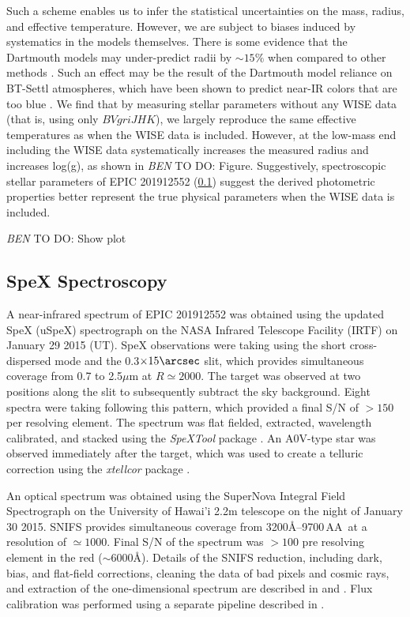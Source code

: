 \documentclass{emulateapj}
\newcommand{\logg}{{log(g)}}
\newcommand{\todo}[3]{{\color{#2} \emph{#1} TO DO: #3}}
\newcommand{\btmtodo}[1]{\todo{BEN}{red}{#1}}
\begin{document}
Such a scheme enables us to infer the statistical uncertainties on the
mass, radius, and effective temperature.
However, we are subject to biases induced by systematics in the models themselves.
There is some evidence that the Dartmouth models may under-predict
radii by $\sim 15\%$ when compared to other methods \citep{Newton15,
Montet15}.
Such an effect may be the result of the Dartmouth model reliance on BT-Settl
atmospheres, which have been shown to predict near-IR colors that are too blue
\citep{Thompson14}.
We find that by measuring stellar parameters without any WISE data (that is, using
only $BVgriJHK$), we largely reproduce the same effective temperatures as when
the WISE data is included.
However, at the low-mass end including the WISE data systematically increases the
measured radius and increases \logg, as shown in \btmtodo{Figure}.
Suggestively, spectroscopic stellar parameters of EPIC 201912552
(\textsection\ref{Spexobs}) suggest the derived photometric properties better
represent the true physical parameters when the WISE data is included.


\btmtodo{Show plot}



\subsection{SpeX Spectroscopy}
\label{Spexobs}


A near-infrared spectrum of EPIC 201912552 was obtained using the updated SpeX
(uSpeX) spectrograph \citep{Rayner03} on the NASA Infrared Telescope Facility
(IRTF) on January 29 2015 (UT).
SpeX observations were taking using the short cross-dispersed mode and the
0.3$\times15\arcsec$ slit, which provides simultaneous coverage from 0.7
to 2.5$\mu$m at $R\simeq2000$.
The target was observed at two positions along the slit to subsequently subtract
the sky background. Eight spectra were taking following this pattern, which provided
a final S/N of $>150$ per resolving element.
The spectrum was flat fielded, extracted, wavelength calibrated, and stacked
using the \textit{SpeXTool} package \citep{Cushing04}.
An A0V-type star was observed immediately after
the target, which was used to create a telluric correction using the
\textit{xtellcor} package \citep{Vacca03}.

An optical spectrum was obtained using the SuperNova Integral Field Spectrograph
\citep[SNIFS,][]{Aldering02,Lantz04} on the University of Hawai'i
2.2m telescope on the night of January 30 2015.
SNIFS provides simultaneous coverage from 3200\AA--9700\,AA\ at a resolution
of $\simeq1000$. Final S/N of the spectrum was $>100$ pre resolving element
in the red ($\sim6000$\AA).
Details of the SNIFS reduction, including dark, bias, and flat-field corrections,
cleaning the data of bad pixels and cosmic rays, and extraction of the
one-dimensional spectrum are described in \citet{Bacon01} and
\citet{Aldering06}.
Flux calibration was performed using a separate pipeline described in \citet{Mann15}.
\end{document}
